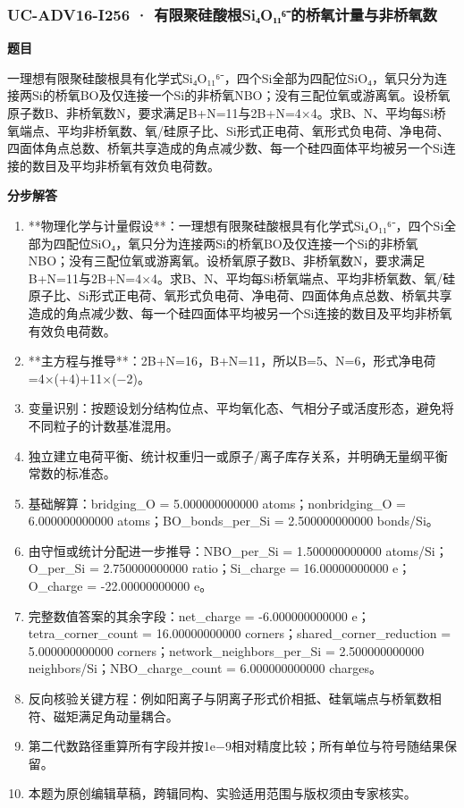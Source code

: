 \documentclass[UTF8,11pt,a4paper]{ctexart}
\begin{document}
\subsubsection*{UC-ADV16-I256 · 有限聚硅酸根Si₄O₁₁⁶⁻的桥氧计量与非桥氧数}
\noindent\textbf{题目}\par
一理想有限聚硅酸根具有化学式Si₄O₁₁⁶⁻，四个Si全部为四配位SiO₄，氧只分为连接两Si的桥氧BO及仅连接一个Si的非桥氧NBO；没有三配位氧或游离氧。设桥氧原子数B、非桥氧数N，要求满足B+N=11与2B+N=4×4。求B、N、平均每Si桥氧端点、平均非桥氧数、氧/硅原子比、Si形式正电荷、氧形式负电荷、净电荷、四面体角点总数、桥氧共享造成的角点减少数、每一个硅四面体平均被另一个Si连接的数目及平均非桥氧有效负电荷数。\par
\medskip\noindent\textbf{分步解答}
\begin{enumerate}
\item **物理化学与计量假设**：一理想有限聚硅酸根具有化学式Si₄O₁₁⁶⁻，四个Si全部为四配位SiO₄，氧只分为连接两Si的桥氧BO及仅连接一个Si的非桥氧NBO；没有三配位氧或游离氧。设桥氧原子数B、非桥氧数N，要求满足B+N=11与2B+N=4×4。求B、N、平均每Si桥氧端点、平均非桥氧数、氧/硅原子比、Si形式正电荷、氧形式负电荷、净电荷、四面体角点总数、桥氧共享造成的角点减少数、每一个硅四面体平均被另一个Si连接的数目及平均非桥氧有效负电荷数。
\item **主方程与推导**：2B+N=16，B+N=11，所以B=5、N=6，形式净电荷=4×(+4)+11×(−2)。
\item 变量识别：按题设划分结构位点、平均氧化态、气相分子或活度形态，避免将不同粒子的计数基准混用。
\item 独立建立电荷平衡、统计权重归一或原子/离子库存关系，并明确无量纲平衡常数的标准态。
\item 基础解算：bridging\_O = 5.000000000000 atoms；nonbridging\_O = 6.000000000000 atoms；BO\_bonds\_per\_Si = 2.500000000000 bonds/Si。
\item 由守恒或统计分配进一步推导：NBO\_per\_Si = 1.500000000000 atoms/Si；O\_per\_Si = 2.750000000000 ratio；Si\_charge = 16.00000000000 e；O\_charge = -22.00000000000 e。
\item 完整数值答案的其余字段：net\_charge = -6.000000000000 e；tetra\_corner\_count = 16.00000000000 corners；shared\_corner\_reduction = 5.000000000000 corners；network\_neighbors\_per\_Si = 2.500000000000 neighbors/Si；NBO\_charge\_count = 6.000000000000 charges。
\item 反向核验关键方程：例如阳离子与阴离子形式价相抵、硅氧端点与桥氧数相符、磁矩满足角动量耦合。
\item 第二代数路径重算所有字段并按1e−9相对精度比较；所有单位与符号随结果保留。
\item 本题为原创编辑草稿，跨辑同构、实验适用范围与版权须由专家核实。
\end{enumerate}
\end{document}
